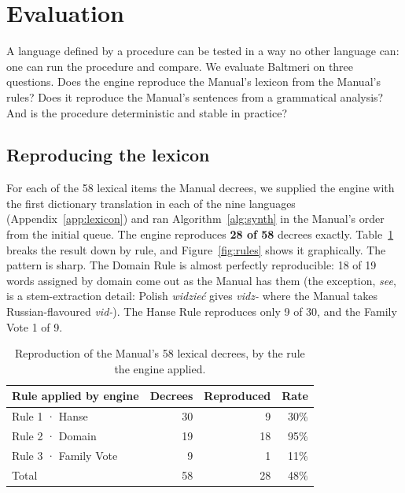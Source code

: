 \section{Evaluation}\label{sec:eval}

A language defined by a procedure can be tested in a way no other language can: one can run the procedure and compare. We evaluate Baltmeri on three questions. Does the engine reproduce the Manual's lexicon from the Manual's rules? Does it reproduce the Manual's sentences from a grammatical analysis? And is the procedure deterministic and stable in practice?

\subsection{Reproducing the lexicon}\label{sec:eval-lex}
For each of the 58 lexical items the Manual decrees, we supplied the engine with the first dictionary translation in each of the nine languages (Appendix~\ref{app:lexicon}) and ran Algorithm~\ref{alg:synth} in the Manual's order from the initial queue. The engine reproduces \textbf{28 of 58} decrees exactly. Table~\ref{tab:rule-stats} breaks the result down by rule, and Figure~\ref{fig:rules} shows it graphically. The pattern is sharp. The Domain Rule is almost perfectly reproducible: 18 of 19 words assigned by domain come out as the Manual has them (the exception, \emph{see}, is a stem-extraction detail: Polish \emph{widzieć} gives \emph{vidz-} where the Manual takes Russian-flavoured \emph{vid-}). The Hanse Rule reproduces only 9 of 30, and the Family Vote 1 of 9.

\begin{table}[t]
\centering\small
\caption{Reproduction of the Manual's 58 lexical decrees, by the rule the engine applied.}
\label{tab:rule-stats}
\begin{tabular}{@{}lrrr@{}}
\toprule
Rule applied by engine & Decrees & Reproduced & Rate \\
\midrule
Rule 1 · Hanse & 30 & 9 & 30\% \\
Rule 2 · Domain & 19 & 18 & 95\% \\
Rule 3 · Family Vote & 9 & 1 & 11\% \\
\midrule
Total & 58 & 28 & 48\% \\
\bottomrule
\end{tabular}
\end{table}

